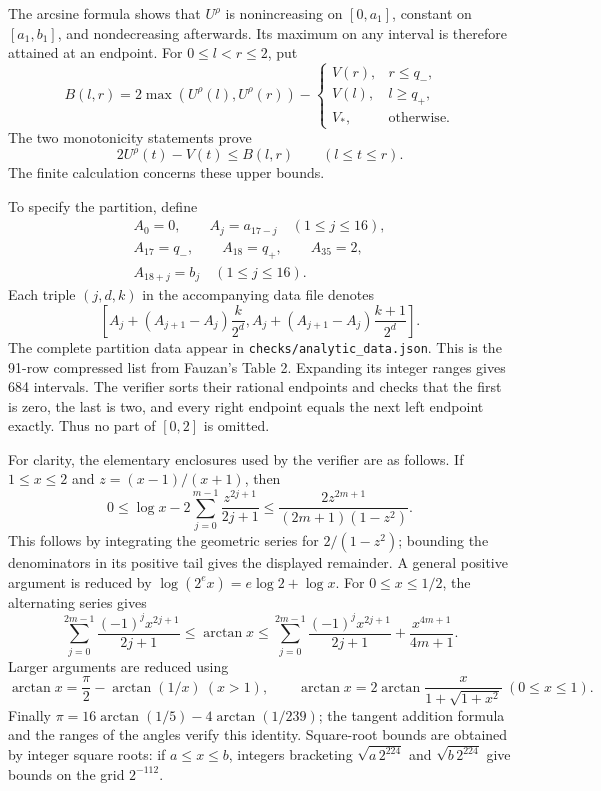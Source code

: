 The arcsine formula shows that \(U^\rho\) is nonincreasing on
\([0,a_1]\), constant on \([a_1,b_1]\), and nondecreasing afterwards.
Its maximum on any interval is therefore attained at an endpoint.
For \(0\leq l<r\leq2\), put
\[
 B(l,r)=2\max(U^\rho(l),U^\rho(r))-
 \begin{cases}
 V(r),&r\leq q_-,\\
 V(l),&l\geq q_+,\\
 V_*,&\text{otherwise}.
 \end{cases}
\]
The two monotonicity statements prove
\[
 2U^\rho(t)-V(t)\leq B(l,r)\qquad(l\leq t\leq r).
\]
The finite calculation concerns these upper bounds.

To specify the partition, define
\[
\begin{gathered}
 A_0=0,\qquad A_j=a_{17-j}\quad(1\leq j\leq16),\\
 A_{17}=q_-,\qquad A_{18}=q_+,\qquad A_{35}=2,\\
 A_{18+j}=b_j\quad(1\leq j\leq16).
\end{gathered}
\]
Each triple \((j,d,k)\) in the accompanying data file denotes
\begin{equation}\label{analytic:partition}
 \left[A_j+(A_{j+1}-A_j)\frac{k}{2^d},
       A_j+(A_{j+1}-A_j)\frac{k+1}{2^d}\right].
\end{equation}
The complete partition data appear in
\texttt{checks/\allowbreak analytic\_data.json}.
This is the 91-row compressed list from Fauzan's Table 2. Expanding its integer
ranges gives 684 intervals. The verifier sorts their rational endpoints
and checks that the first is zero, the last is two, and every right
endpoint equals the next left endpoint exactly. Thus no part of
\([0,2]\) is omitted.

For clarity, the elementary enclosures used by the verifier are as
follows. If \(1\leq x\leq2\) and \(z=(x-1)/(x+1)\), then
\begin{equation}\label{analytic:log-series}
 0\leq\log x-2\sum_{j=0}^{m-1}\frac{z^{2j+1}}{2j+1}
 \leq\frac{2z^{2m+1}}{(2m+1)(1-z^2)}.
\end{equation}
This follows by integrating the geometric series for \(2/(1-z^2)\);
bounding the denominators in its positive tail gives the displayed
remainder. A general positive argument is reduced by
\(\log(2^e x)=e\log2+\log x\).
For \(0\leq x\leq1/2\), the alternating series gives
\begin{equation}\label{analytic:atan-series}
 \sum_{j=0}^{2m-1}\frac{(-1)^j x^{2j+1}}{2j+1}
 \leq \arctan x
 \leq \sum_{j=0}^{2m-1}\frac{(-1)^j x^{2j+1}}{2j+1}
                    +\frac{x^{4m+1}}{4m+1}.
\end{equation}
Larger arguments are reduced using
\[
 \arctan x=\frac\pi2-\arctan(1/x)\ (x>1),\qquad
 \arctan x=2\arctan\frac{x}{1+\sqrt{1+x^2}}\ (0\leq x\leq1).
\]
Finally \(\pi=16\arctan(1/5)-4\arctan(1/239)\); the tangent addition
formula and the ranges of the angles verify this identity.
Square-root bounds are obtained by integer square roots: if
\(a\leq x\leq b\), integers bracketing
\(\sqrt{a\,2^{224}}\) and \(\sqrt{b\,2^{224}}\) give bounds on
the grid \(2^{-112}\).

